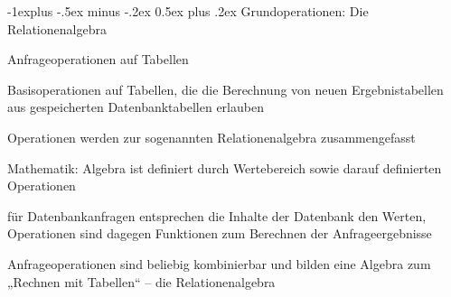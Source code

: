 \documentclass[a4paper]{article}
\makeatletter
\renewcommand{\subsection}{\@startsection{subsection}{2}{0mm}%
                                {-1explus -.5ex minus -.2ex}%
                                {0.5ex plus .2ex}%
                                {\normalfont\normalsize\bfseries}}
\makeatother
\begin{document}
\begin{multicols}{3}
\subsection{Grundoperationen: Die Relationenalgebra}
\begin{itemize*}
    \item Anfrageoperationen auf Tabellen
    \begin{itemize*}
        \item Basisoperationen auf Tabellen, die die Berechnung von neuen Ergebnistabellen aus gespeicherten Datenbanktabellen erlauben
        \item Operationen werden zur sogenannten Relationenalgebra zusammengefasst
        \item Mathematik: Algebra ist definiert durch Wertebereich sowie darauf definierten Operationen
        \begin{itemize*}
            \item für Datenbankanfragen entsprechen die Inhalte der Datenbank den Werten, Operationen sind dagegen Funktionen zum Berechnen der Anfrageergebnisse
        \end{itemize*}
        \item Anfrageoperationen sind beliebig kombinierbar und bilden eine Algebra zum „Rechnen mit Tabellen“ – die Relationenalgebra
    \end{itemize*}
\end{itemize*}


\end{multicols}
\end{document}
